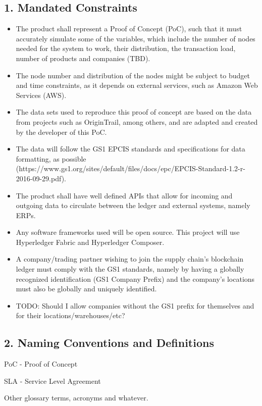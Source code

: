 \subsection*{1. Mandated Constraints}
    \begin{itemize}
		\item The product shall represent a Proof of Concept (PoC), such that it must accurately simulate some of the variables, which include the number of nodes needed for the system to work, their distribution, the transaction load, number of products and companies (TBD).
		\item The node number and distribution of the nodes might be subject to budget and time constraints, as it depends on external services, such as Amazon Web Services (AWS).
		\item The data sets used to reproduce this proof of concept are based on the data from projects such as OriginTrail, among others, and are adapted and created by the developer of this PoC.
		\item The data will follow the GS1 EPCIS standards and specifications for data formatting, as possible (https://www.gs1.org/sites/default/files/docs/epc/EPCIS-Standard-1.2-r-2016-09-29.pdf).
		\item The product shall have well defined APIs that allow for incoming and outgoing data to circulate between the ledger and external systems, namely ERPs.
		\item Any software frameworks used will be open source. This project will use Hyperledger Fabric and Hyperledger Composer.
		\item A company/trading partner wishing to join the supply chain's blockchain ledger must comply with the GS1 standards, namely by having a globally recognized identification (GS1 Company Prefix) and the company's locations must also be globally and uniquely identified.
		\item TODO: Should I allow companies without the GS1 prefix for themselves and for their locations/warehouses/etc? 
        \end{itemize}
        \subsection*{2. Naming Conventions and Definitions}


		\par PoC - Proof of Concept
		\par SLA - Service Level Agreement
		\par Other glossary terms, acronyms and whatever.
		
